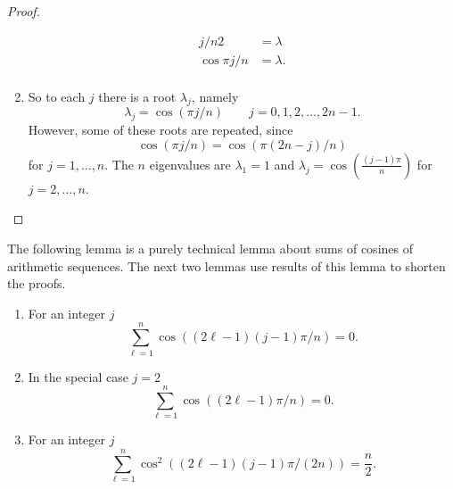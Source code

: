 \documentclass[12pt]{article}
\begin{document}
\begin{proof}
\begin{enumerate}
\begin{align*}
{{                j/n}}{2} &= \lambda \\
                \cos{\pi j/n } &= \lambda.  \\
            \end{align*}
        \item
            So to each \( j \) there is a root \( \lambda_j \), namely
            \[
                \lambda_j = \cos( \pi j/n ) \qquad j = 0,1,2, \dots,
                2n-1.
            \] However, some of these roots are repeated, since
            \[
                \cos( \pi j/n ) = \cos( \pi (2n-j)/n )
            \] for \( j = 1, \dots, n \).  The \( n \) eigenvalues are \(
            \lambda_1 = 1 \) and \( \lambda_j = \cos\left( \frac{(j-1)
            \pi}{n} \right) \) for \( j=2, \dots, n \).
    \end{enumerate}
\end{proof}

\begin{remark}
    The following lemma is a purely technical lemma about sums of
    cosines of arithmetic sequences.  The next two lemmas use results of
    this lemma to shorten the proofs.
\end{remark}

\begin{lemma}
    \label{fastestmixing:lemma:cossum}
    \begin{enumerate}
        \item
            For an integer \( j \)
            \[
                \sum_{\ell=1}^{n} \cos((2 \ell-1)(j-1)\pi/n) = 0.
            \]
        \item
            In the special case \( j=2 \)
            \[
                \sum_{\ell=1}^{n} \cos((2 \ell-1)\pi/n) = 0.
            \]
        \item
            For an integer \( j \)
            \[
                \sum_{\ell=1}^{n} \cos^2((2 \ell-1)(j-1)\pi/(2n)) =
                \frac{n}{2}.
            \]
    \end{enumerate}
\end{lemma}
\end{document}
